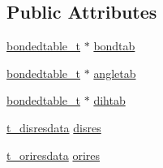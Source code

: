 \subsection*{\-Public \-Attributes}
\begin{DoxyCompactItemize}
\item 
\hyperlink{structbondedtable__t}{bondedtable\-\_\-t} $\ast$ \hyperlink{structt__fcdata_a4efc8f3e6f22eae188fac8fedf865382}{bondtab}
\item 
\hyperlink{structbondedtable__t}{bondedtable\-\_\-t} $\ast$ \hyperlink{structt__fcdata_abb2c29b026665e40a5e70234c55b2d51}{angletab}
\item 
\hyperlink{structbondedtable__t}{bondedtable\-\_\-t} $\ast$ \hyperlink{structt__fcdata_a6342da34fb6df67d3d2e3babeaaae3ec}{dihtab}
\item 
\hyperlink{structt__disresdata}{t\-\_\-disresdata} \hyperlink{structt__fcdata_ab08031231076f48cbbc06a2e852fd6ba}{disres}
\item 
\hyperlink{structt__oriresdata}{t\-\_\-oriresdata} \hyperlink{structt__fcdata_a31b52d818c8f5092c32bc33a2ab9e975}{orires}
\end{DoxyCompactItemize}


